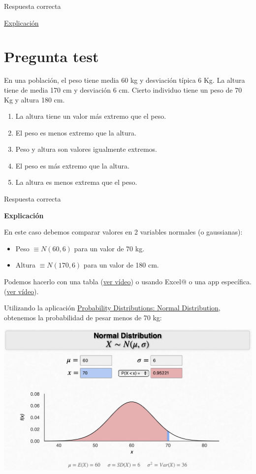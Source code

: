 \documentclass[
]{book}
\providecommand{\tightlist}{%
  \setlength{\itemsep}{0pt}\setlength{\parskip}{0pt}}
\begin{document}
Respuesta correcta

\href{https://1fjmanzano.github.io/bioestadistica/distribuciones-de-probabilidad.html\#distribucio\%CC\%81n-z}{Explicación}

\hypertarget{pregunta-test-98}{%
\section{Pregunta test}\label{pregunta-test-98}}

En una población, el peso tiene media 60 kg y desviación típica 6 Kg. La altura tiene de media 170 cm y desviación 6 cm. Cierto individuo tiene un peso de 70 Kg y altura 180 cm.

\begin{enumerate}
\def\labelenumi{\alph{enumi})}
\tightlist
\item
  La altura tiene un valor más extremo que el peso.
\item
  El peso es menos extremo que la altura.
\item
  Peso y altura son valores igualmente extremos.
\item
  El peso es más extremo que la altura.
\item
  La altura es menos extrema que el peso.
\end{enumerate}

Respuesta correcta

\textbf{Explicación}

En este caso debemos comparar valores en 2 variables normales (o gaussianas):

\begin{itemize}
\tightlist
\item
  Peso \(\equiv N(60, 6)\) para un valor de 70 kg.
\item
  Altura \(\equiv N(170, 6)\) para un valor de 180 cm.
\end{itemize}

Podemos hacerlo con una tabla (\href{https://youtu.be/xCBUdpIUx18}{ver vídeo}) o usando Excel@ o una app específica. (\href{https://youtu.be/rxkPlU1Ud7c}{ver vídeo}).

Utilizando la aplicación \href{https://homepage.divms.uiowa.edu/~mbognar/applets/normal.html}{Probability Distributions: Normal Distribution}, obtenemos la probabilidad de pesar menos de 70 kg:

\includegraphics[width=20.78in]{img/3_1}
\end{document}
